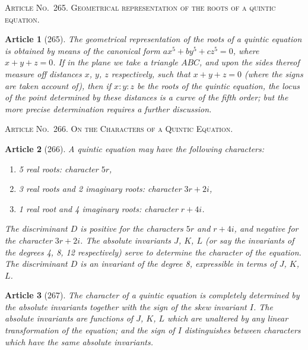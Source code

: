 \documentclass[11pt,a4paper]{article}
\theoremstyle{cayley}
\newtheorem{art}{Article}
\begin{document}
\begin{center}
\textsc{Article No.\ 265. Geometrical representation of the roots of a quintic equation.}
\end{center}

\begin{art}[265]
The geometrical representation of the roots of a quintic equation is obtained by means of the canonical form $ax^5 + by^5 + cz^5 = 0$, where $x + y + z = 0$. If in the plane we take a triangle $ABC$, and upon the sides thereof measure off distances $x$, $y$, $z$ respectively, such that $x + y + z = 0$ (where the signs are taken account of), then if $x : y : z$ be the roots of the quintic equation, the locus of the point determined by these distances is a curve of the fifth order; but the more precise determination requires a further discussion.
\end{art}

\begin{center}
\textsc{Article No.\ 266. On the Characters of a Quintic Equation.}
\end{center}

\begin{art}[266]
A quintic equation may have the following characters:
\begin{enumerate}[label=$\arabic*\rlap{r}$,itemsep=0pt,parsep=0pt]
\item 5 real roots: character $5r$,
\item 3 real roots and 2 imaginary roots: character $3r + 2i$,
\item 1 real root and 4 imaginary roots: character $r + 4i$.
\end{enumerate}
The discriminant $D$ is positive for the characters $5r$ and $r + 4i$, and negative for the character $3r + 2i$. The absolute invariants $J$, $K$, $L$ (or say the invariants of the degrees 4, 8, 12 respectively) serve to determine the character of the equation. The discriminant $D$ is an invariant of the degree 8, expressible in terms of $J$, $K$, $L$.
\end{art}

\begin{art}[267]
The character of a quintic equation is completely determined by the absolute invariants together with the sign of the skew invariant $I$. The absolute invariants are functions of $J$, $K$, $L$ which are unaltered by any linear transformation of the equation; and the sign of $I$ distinguishes between characters which have the same absolute invariants.
\end{art}
\end{document}
